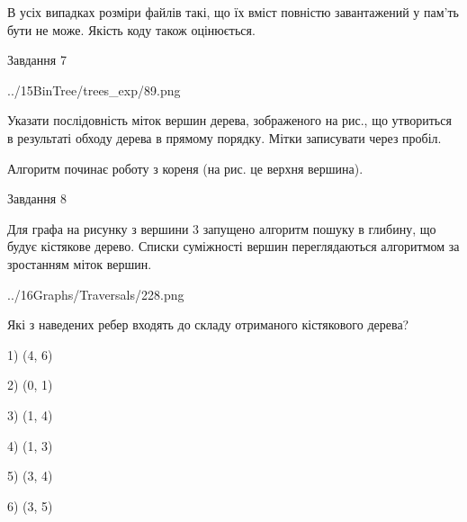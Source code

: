 \documentclass[12pt, ukrainian]{article}
\begin{document}
{В усіх випадках розміри файлів такі, що їх вміст повністю завантажений у пам'ть бути не може. Якість коду також оцінюється.



\vspace{10mm}\par

\newpage
\begin{minipage}[t]{9.7cm}
               
{\begin{center}Завдання {7}\end{center}}
\vspace{-4mm}

\begin{center}
	{../15BinTree/trees_exp/89.png}
\end{center}
Указати послідовність міток вершин дерева, зображеного на рис., що утвориться в результаті обходу дерева в прямому порядку. Мітки записувати через пробіл.\par Алгоритм починає роботу з кореня (на рис. це верхня вершина).\par

\end{minipage}
\vline \hspace{8mm}
\begin{minipage}[t]{8.0cm}
               
{\begin{center}Завдання {8}\end{center}}
\vspace{-4mm}
Для графа на рисунку з вершини 3 запущено алгоритм пошуку в глибину, що будує кістякове дерево. Списки суміжності вершин переглядаються алгоритмом за зростанням міток вершин.\par
\begin{center}
	{../16Graphs/Traversals/228.png}
\end{center}
\par Які з наведених ребер входять до складу отриманого кістякового дерева?\par
1) (4, 6)\par
2) (0, 1)\par
3) (1, 4)\par
4) (1, 3)\par
5) (3, 4)\par
6) (3, 5)\par
{\vskip 15pt} \par


\end{minipage}}
\end{document}
